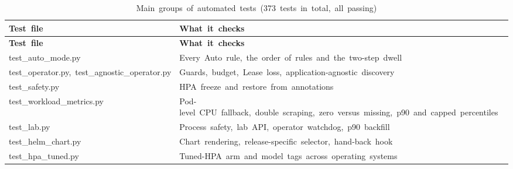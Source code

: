 \documentclass[12pt,a4paper,oneside]{report}
\begin{document}
\begingroup\small\setlength{\tabcolsep}{4pt}\renewcommand{\arraystretch}{1.25}
\begin{longtable}{|>{\raggedright\arraybackslash}p{5.65cm}|>{\raggedright\arraybackslash}p{9.21cm}|}
\caption{Main~groups~of~automated~tests~(373~tests~in~total,~all~passing)}\label{tab:tests}\\\hline
\textbf{Test~file} & \textbf{What~it~checks}\\\hline\endfirsthead
\hline \textbf{Test~file} & \textbf{What~it~checks}\\\hline\endhead
test\_auto\_mode.py & Every~Auto~rule,~the~order~of~rules~and~the~two-step~dwell\\\hline
test\_operator.py,~test\_agnostic\_operator.py & Guards,~budget,~Lease~loss,~application-agnostic~discovery\\\hline
test\_safety.py & HPA~freeze~and~restore~from~annotations\\\hline
test\_workload\_metrics.py & Pod-level~CPU~fallback,~double~scraping,~zero~versus~missing,~p90~and~capped~percentiles\\\hline
test\_lab.py & Process~safety,~lab~API,~operator~watchdog,~p90~backfill\\\hline
test\_helm\_chart.py & Chart~rendering,~release-specific~selector,~hand-back~hook\\\hline
test\_hpa\_tuned.py & Tuned-HPA~arm~and~model~tags~across~operating~systems\\\hline
\end{longtable}\endgroup
\end{document}
